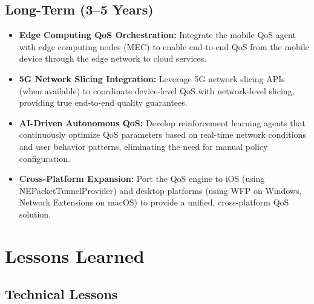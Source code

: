 \subsection{Long-Term (3--5 Years)}

\begin{itemize}
    \item \textbf{Edge Computing QoS Orchestration:} Integrate the mobile QoS agent with edge computing nodes (MEC) to enable end-to-end QoS from the mobile device through the edge network to cloud services.
    
    \item \textbf{5G Network Slicing Integration:} Leverage 5G network slicing APIs (when available) to coordinate device-level QoS with network-level slicing, providing true end-to-end quality guarantees.
    
    \item \textbf{AI-Driven Autonomous QoS:} Develop reinforcement learning agents that continuously optimize QoS parameters based on real-time network conditions and user behavior patterns, eliminating the need for manual policy configuration.
    
    \item \textbf{Cross-Platform Expansion:} Port the QoS engine to iOS (using NEPacketTunnelProvider) and desktop platforms (using WFP on Windows, Network Extensions on macOS) to provide a unified, cross-platform QoS solution.
\end{itemize}

\section{Lessons Learned}
\label{sec:lessons}

\subsection{Technical Lessons}

